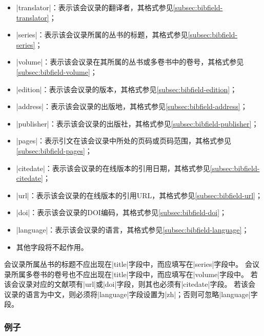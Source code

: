 \begin{itemize}
\item |translator|：表示该会议录的翻译者，其格式参见\ref{subsec:bibfield-translator}；
\item |series|：表示该会议录所属的丛书的标题，其格式参见\ref{subsec:bibfield-series}；
\item |volume|：表示该会议录在其所属的丛书或多卷书中的卷号，其格式参见\ref{subsec:bibfield-volume}；
\item |edition|：表示该会议录的版本，其格式参见\ref{subsec:bibfield-edition}；
\item |address|：表示该会议录的出版地，其格式参见\ref{subsec:bibfield-address}；
\item |publisher|：表示该会议录的出版社，其格式参见\ref{subsec:bibfield-publisher}；
\item |pages|：表示引文在该会议录中所处的页码或页码范围，其格式参见\ref{subsec:bibfield-pages}；
\item |citedate|：表示该会议录的在线版本的引用日期，其格式参见\ref{subsec:bibfield-citedate}；
\item |url|：表示该会议录的在线版本的引用URL，其格式参见\ref{subsec:bibfield-url}；
\item |doi|：表示该会议录的DOI编码，其格式参见\ref{subsec:bibfield-doi}；
\item |language|：表示该会议录的语言，其格式参见\ref{subsec:bibfield-language}；
\item 其他字段将不起作用。
\end{itemize}

\begin{note}
会议录所属丛书的标题不应出现在|title|字段中，而应填写在|series|字段中。
会议录所属多卷书的卷号也不应出现在|title|字段中，而应填写在|volume|字段中。
若该会议录对应的文献项有|url|或|doi|字段，则其也必须有|citedate|字段。
若该会议录的语言为中文，则必须将|language|字段设置为|zh|；否则可忽略|language|字段。
\end{note}

\subsubsection{例子}

